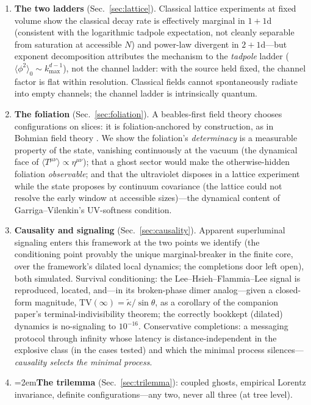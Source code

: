 \documentclass[11pt]{article}
\theoremstyle{definition}
\theoremstyle{remark}
\newcommand{\avg}[1]{\langle #1 \rangle}
\begin{document}
\begin{enumerate}
{individuating structure---a frame or a birth surface}. We port the bubble literature's multiplicity-vs-redundancy
resolution \cite{KOV1975,ColemanBounce,Dvali2011,DDP2012,GKT2013,GSV2011}
and show its two mechanisms (saddle symmetry; excitation cost) are
absent, at tree level, for perturbative ghost decay.
\item \textbf{The two ladders} (Sec.~\ref{sec:lattice}). Classical
lattice experiments at fixed volume show the classical decay rate is
effectively marginal in $1{+}1$d (consistent with the logarithmic tadpole expectation, not cleanly separable from saturation at accessible $N$) and power-law divergent
in $2{+}1$d---but exponent
decomposition attributes the mechanism to the \emph{tadpole} ladder
($\avg{\phi^2}_0\sim k_{\max}^{d-1}$), not the channel ladder: with
the source held fixed, the channel factor is flat within resolution. Classical fields
cannot spontaneously radiate into empty channels; the channel ladder
is intrinsically quantum.
\item \textbf{The foliation} (Sec.~\ref{sec:foliation}). A
beables-first field theory chooses configurations on slices: it is
foliation-anchored by construction, as in Bohmian field theory
\cite{HypersurfaceBD,DGNSZ2014}. We show the foliation's
\emph{determinacy} is a measurable property of the state, vanishing
continuously at the vacuum (the dynamical face of
$\avg{T^{\mu\nu}}\propto\eta^{\mu\nu}$); that a ghost sector would
make the otherwise-hidden foliation \emph{observable}; and that the ultraviolet disposes in a
lattice experiment while the state proposes by continuum covariance (the
lattice could not resolve the early window at accessible sizes)---the
dynamical content of Garriga--Vilenkin's UV-softness condition.
\item \textbf{Causality and signaling} (Sec.~\ref{sec:causality}).
Apparent superluminal signaling enters this framework at the two
points we identify (the conditioning point provably the unique marginal-breaker in the finite core, over the framework's dilated local dynamics; the completions door left open), both simulated. Survival conditioning: the
Lee--Hsieh--Flammia--Lee signal \cite{LHFL2014} is reproduced,
located, and---in its broken-phase dimer analog---given a closed-form
magnitude, $\mathrm{TV}(\infty)=\tilde\kappa/\sin\theta$, as a corollary
of the companion paper's terminal-indivisibility theorem; the correctly
bookkept (dilated) dynamics is no-signaling to $10^{-16}$.
Conservative completions: a messaging protocol through infinity
whose latency is distance-independent in the explosive class (in the
cases tested) and which the minimal process silences---\emph{causality selects the
minimal process}.
\item \emergencystretch=2em\textbf{The trilemma} (Sec.~\ref{sec:trilemma}):
coupled ghosts, empirical Lorentz invariance, definite
configurations---any two, never all three (at tree level).
\end{enumerate}
\end{document}
